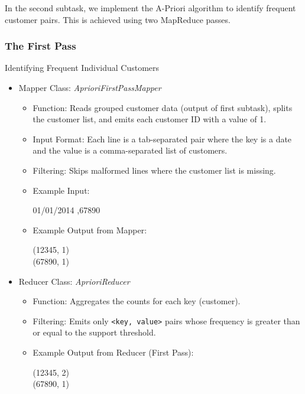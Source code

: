 In the second subtask, we implement the A-Priori algorithm to identify frequent customer pairs.
This is achieved using two MapReduce passes.

\subsubsection{The First Pass} Identifying Frequent Individual Customers

\begin{itemize}
    \item Mapper Class: \textit{AprioriFirstPassMapper}
    \begin{itemize}
        \item Function: Reads grouped customer data (output of first subtask), splits the customer list, and emits each customer ID with a value of 1.
        \item Input Format: Each line is a tab-separated pair where the key is a date and the value is a comma-separated list of customers.
        \item Filtering: Skips malformed lines where the customer list is missing.
        \item Example Input:
        \begin{center}
            01/01/2014 ,67890
        \end{center}
        \item Example Output from Mapper:
        \begin{center}
        (12345, 1)\\
        (67890, 1)
        \end{center}
    \end{itemize}

    \item Reducer Class: \textit{AprioriReducer}
    \begin{itemize}
        \item Function: Aggregates the counts for each key (customer).
        \item Filtering: Emits only \texttt{<key, value>} pairs whose frequency is greater than or equal to the support threshold.
        \item Example Output from Reducer (First Pass):
        \begin{center}
        (12345, 2)\\
        (67890, 1)
        \end{center}
    \end{itemize}
\end{itemize}


